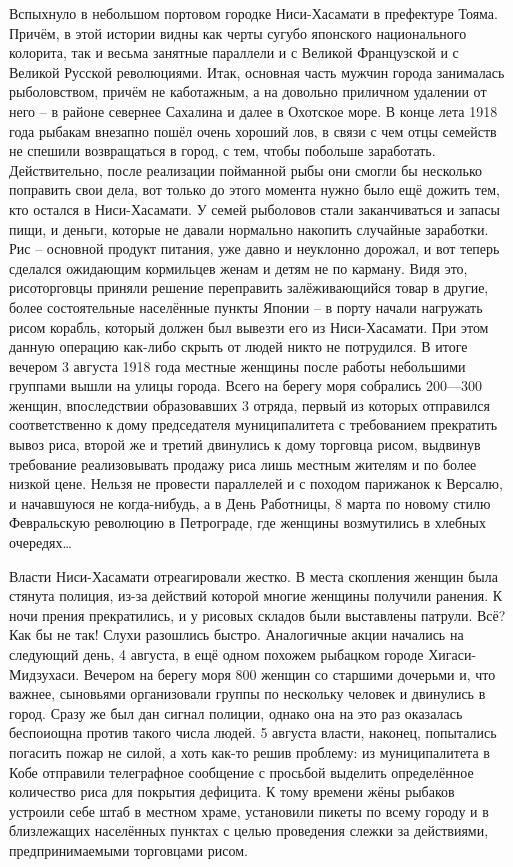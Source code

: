Вспыхнуло в небольшом портовом городке Ниси-Хасамати в префектуре Тояма. Причём, в этой истории видны как черты сугубо японского национального колорита, так и весьма занятные параллели и с Великой Французской и с Великой Русской революциями. Итак, основная часть мужчин города занималась рыболовством, причём не каботажным, а на довольно приличном удалении от него – в районе севернее Сахалина и далее в Охотское море. В конце лета 1918 года рыбакам внезапно пошёл очень хороший лов, в связи с чем отцы семейств не спешили возвращаться в город, с тем, чтобы побольше заработать. Действительно, после реализации пойманной рыбы они смогли бы несколько поправить свои дела, вот только до этого момента нужно было ещё дожить тем, кто остался в Ниси-Хасамати. У семей рыболовов стали заканчиваться и запасы пищи, и деньги, которые не давали нормально накопить случайные заработки. Рис – основной продукт питания, уже давно и неуклонно дорожал, и вот теперь сделался ожидающим кормильцев женам и детям не по карману. Видя это, рисоторговцы приняли решение переправить залёживающийся товар в другие, более состоятельные населённые пункты Японии – в порту начали нагружать рисом корабль, который должен был вывезти его из Ниси-Хасамати. При этом данную операцию как-либо скрыть от людей никто не потрудился. В итоге вечером 3 августа 1918 года местные женщины после работы небольшими группами вышли на улицы города. Всего на берегу моря собрались 200—300 женщин, впоследствии образовавших 3 отряда, первый из которых отправился соответственно к дому председателя муниципалитета с требованием прекратить вывоз риса, второй же и третий двинулись к дому торговца рисом, выдвинув требование реализовывать продажу риса лишь местным жителям и по более низкой цене. Нельзя не провести параллелей и с походом парижанок к Версалю, и начавшуюся не когда-нибудь, а в День Работницы, 8 марта по новому стилю Февральскую революцию в Петрограде, где женщины возмутились в хлебных очередях…

Власти Ниси-Хасамати отреагировали жестко. В места скопления женщин была стянута полиция, из-за действий которой многие женщины получили ранения. К ночи прения прекратились, и у рисовых складов были выставлены патрули. Всё? Как бы не так! Слухи разошлись быстро. Аналогичные акции начались на следующий день, 4 августа, в ещё одном похожем рыбацком городе Хигаси-Мидзухаси. Вечером на берегу моря 800 женщин со старшими дочерьми и, что важнее, сыновьями организовали группы по нескольку человек и двинулись в город. Сразу же был дан сигнал полиции, однако она на это раз оказалась беспоиощна против такого числа людей. 5 августа власти, наконец, попытались погасить пожар не силой, а хоть как-то решив проблему: из муниципалитета в Кобе отправили телеграфное сообщение с просьбой выделить определённое количество риса для покрытия дефицита. К тому времени жёны рыбаков устроили себе штаб в местном храме, установили пикеты по всему городу и в близлежащих населённых пунктах с целью проведения слежки за действиями, предпринимаемыми торговцами рисом.

